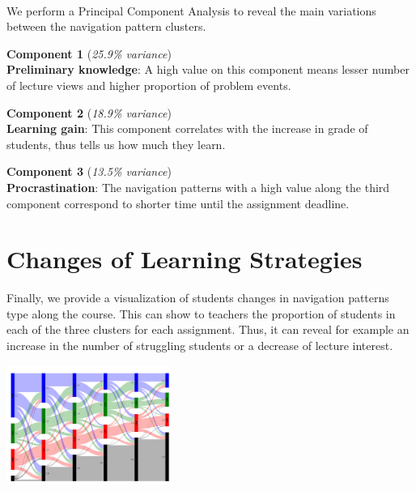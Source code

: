 \documentclass[a0,portrait]{a0poster}
\begin{document}
\begin{minipage}[c]{\linewidth}
\begin{framed}
\begin{multicols}{2}
~\\
We perform a Principal Component Analysis to reveal the main variations between the navigation pattern clusters. \\
\vspace{0.8cm}

\textbf{Component 1} (\textit{25.9\% variance}) \\
\textbf{Preliminary knowledge}: A high value on this component means lesser number of lecture views and higher proportion of problem events.
\vspace{1.5cm}

\textbf{Component 2} (\textit{18.9\% variance}) \\
\textbf{Learning gain}: This component correlates with the increase in grade of students, thus tells us how much they learn.
\vspace{1.5cm}

\textbf{Component 3} (\textit{13.5\% variance}) \\
\textbf{Procrastination}: The navigation patterns with a high value along the third component correspond to shorter time until the assignment deadline.
\vspace{2.25cm}

\section*{Changes of Learning Strategies}
Finally, we provide a visualization of students changes in navigation patterns type along the course. This can show to teachers the proportion of students in each of the three clusters for each assignment. Thus, it can reveal for example an increase in the number of struggling students or a decrease of lecture interest. 

\begin{center}
\includegraphics[width=0.4\textwidth]{figures/strategies}
\end{center}
\vspace{0.1cm}

\end{multicols}
\vspace{0.5cm}
\end{framed}
\end{minipage}
\end{document}
